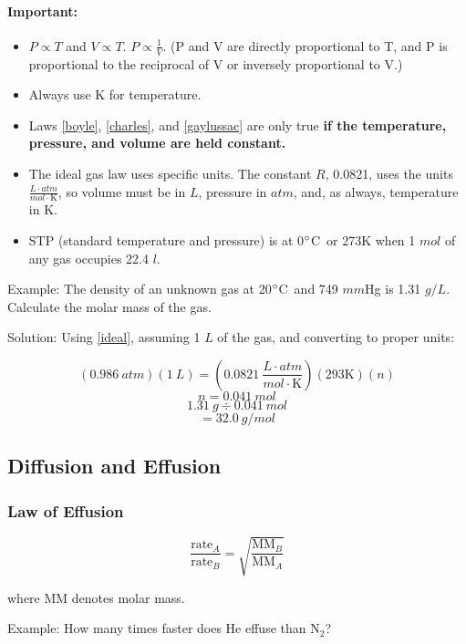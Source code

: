 \documentclass[a4paper, 12pt]{article}
\newcommand{\degC}{$\degree$C \,}
\newcommand{\R}{\left(0.0821 \: \frac{L \cdot atm}{mol \cdot \text{K}}\right)}
\begin{document}
\paragraph{Important:}

\begin{itemize}[leftmargin=*, nosep]
    \item $P \propto T$ and $V \propto T$. $P \propto \frac{1}{V}$. (P and V are directly proportional to T, and P is proportional to the reciprocal of V or inversely proportional to V.)
    \item Always use K for temperature.
    \item Laws \ref{boyle}, \ref{charles}, and \ref{gaylussac} are only true \textbf{if the temperature, pressure, and volume are held constant.}
    \item The ideal gas law uses specific units. The constant $R$, 0.0821, uses the units $\frac{L \cdot atm}{mol \cdot \text{K}}$, so volume must be in $L$, pressure in $atm$, and, as always, temperature in K.
    \item STP (standard temperature and pressure) is at 0\degC or 273K when 1 $mol$ of any gas occupies 22.4 $l$.
\end{itemize}

Example: The density of an unknown gas at 20\degC and 749 $mm$Hg is 1.31 $g/L$. Calculate the molar mass of the gas.

Solution: Using \ref{ideal}, assuming 1 $L$ of the gas, and converting to proper units:

$$(0.986 \: atm)(1 \: L) = \R (293\text{K})(n)$$
$$n = 0.041 \: mol$$
$$1.31 \: g \div 0.041 \: mol$$
$$=\boxed{32.0 \: g/mol}$$

\subsection{Diffusion and Effusion}

\subsubsection{Law of Effusion}

\begin{equation}\label{effusion}
    \frac{\text{rate}_A}{\text{rate}_B} = \sqrt{\frac{\text{MM}_B}{\text{MM}_A}}
\end{equation}

where MM denotes molar mass.

Example: How many times faster does He effuse than N$_2$?
\end{document}
